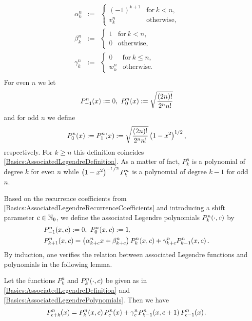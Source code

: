 \begin{eqnarray*}
  \alpha_{k}^n & := & \left\{
    \begin{array}{ll}
      (-1)^{k+1} & \text{for}\ k < n,\\
      v_{k}^n    & \text{otherwise},
    \end{array}\right.\\
  \beta_{k}^n & := & \left\{
    \begin{array}{lll}
      1 & \text{for}\ k < n,\\
      0 & \text{otherwise},
    \end{array}\right.\\
  \gamma_{k}^n & := & \left\{
    \begin{array}{lll}
      0       & \text{for}\ k \leq n,\\
      w_{k}^n & \text{otherwise.}
    \end{array}\right.\\
\end{eqnarray*}
For even $n$ we let
$$ \fun{P_{-1}^n}{x} := 0,\ \fun{P_{0}^n}{x} := \sqrt{\frac{(2n)!}{2^n n!}}$$
and for odd $n$ we define
$$ P_{0}^n{\hspace{-0.4ex}}\left(x\right) := P_{1}^n{\hspace{-0.4ex}}\left(x\right) := \sqrt{\frac{(2n)!}{2^n n!}} \left(1-x^2\right)^{1/2},$$
respectively. For $k \ge n$ this definition coincides \eqref{Basics:AssociatedLegendreDefinition}. 
As a matter of fact, $P_{k}^n$ is a polynomial of degree $k$ for even $n$ while 
$\left(1-x^2\right)^{-1/2}P_{k}^n$ is a polynomial of degree $k-1$ for odd $n$.

Based on the recurrence coefficients from \eqref{Basics:AssociatedLegendreRecurrenceCoefficients} 
and introducing a shift parameter $c \in \mathbb{N}_{0}$, we 
define the associated Legendre polynomials $P_{k}^n{\hspace{-0.4ex}}\left(\cdot,c\right)$ by
\begin{equation}
  \label{Basics:AssociatedLegendrePolynomials}
  \begin{split}
    & P_{-1}^n{\hspace{-0.4ex}}\left(x,c\right) := 0,\ P_{0}^n{\hspace{-0.4ex}}\left(x,c\right) := 1,\\
    & P_{k+1}^n{\hspace{-0.4ex}}\left(x,c\right) = \left(\alpha_{k+c}^n x + \beta_{k+c}^n\right) P_{k}^n{\hspace{-0.4ex}}\left(x,c\right) + \gamma_{k+c}^n P_{k-1}^n{\hspace{-0.4ex}}\left(x,c\right).
  \end{split}
\end{equation}
By induction, one verifies the relation between associated Legendre functions and polynomials in the following lemma.
\begin{lemma}
  \label{Basics:AssociatedLegendreRecurrence}
  Let the functions $P_{k}^n$ and $P_{k}^n{\hspace{-0.4ex}}\left(\cdot,c\right)$ be given as in \eqref{Basics:AssociatedLegendreDefinition} and 
  \eqref{Basics:AssociatedLegendrePolynomials}. Then we have
  $$ P_{c+k}^n{\hspace{-0.4ex}}\left(x\right) = P_{k}^n{\hspace{-0.4ex}}\left(x,c\right) P_{c}^n{\hspace{-0.4ex}}\left(x\right) + \gamma_{c}^n P_{k-1}^n{\hspace{-0.4ex}}\left(x,c+1\right) P_{c-1}^n{\hspace{-0.4ex}}\left(x\right). $$
\end{lemma}

